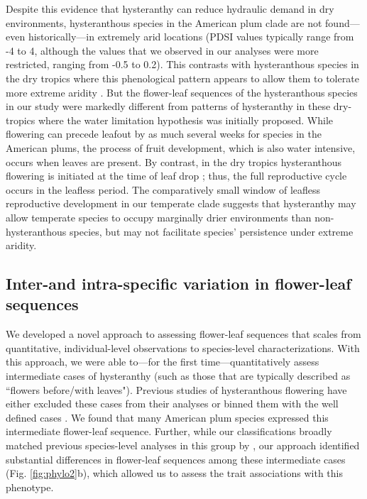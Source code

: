 \documentclass{article}[12pt]
\begin{document}
{Despite this evidence that hysteranthy can reduce hydraulic demand in dry environments, hysteranthous species in the American plum clade are not found---even historically---in extremely arid locations (PDSI values typically range from -4 to 4, although the values that we observed in our analyses were more restricted, ranging from -0.5 to 0.2). This contrasts with hysteranthous species in the dry tropics where this phenological pattern appears to allow them to tolerate more extreme aridity \citep{Franklin2016}. But the flower-leaf sequences of the hysteranthous species in our study were markedly different from patterns of hysteranthy in these dry-tropics where the water limitation hypothesis was initially proposed. While flowering can precede leafout by as much several weeks for species in the American plums, the process of fruit development, which is also water intensive, occurs when leaves are present. By contrast, in the dry tropics hysteranthous flowering is initiated at the time of leaf drop \citep{Borchert1983,Franklin2016}; thus, the full reproductive cycle occurs in the leafless period. The comparatively small window of leafless reproductive development in our temperate clade %
suggests that hysteranthy may allow temperate species to occupy marginally drier environments than non-hysteranthous species, but may not facilitate species' persistence under extreme aridity.  

 
\subsection*{Inter-and intra-specific variation in flower-leaf sequences} %
We developed a novel approach to assessing flower-leaf sequences that scales from quantitative, individual-level observations to species-level characterizations. With this approach, we were able to---for the first time---quantitatively assess intermediate cases of hysteranthy (such as those that are typically described as ``flowers before/with leaves"). Previous studies of hysteranthous flowering have either excluded these cases from their analyses  \citep[e.g.;][]{Gougherty2018} or binned them with the well defined cases \citep[e.g.;][]{Buonaiuto2020}. We found that many American plum species expressed this intermediate flower-leaf sequence. Further, while our classifications broadly matched previous species-level analyses in this group by \citet{Shaw:2004aa}, our approach identified substantial differences in flower-leaf sequences among these intermediate cases (Fig. \ref{fig:phylo2}b), which allowed us to assess the trait associations with this phenotype.
% 

}
\end{document}
